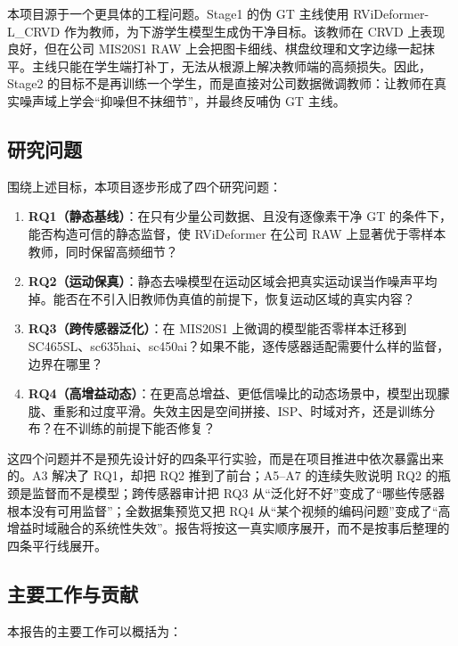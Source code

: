 \documentclass[11pt,a4paper,UTF8,fontset=fandol]{ctexart}
\begin{document}
本项目源于一个更具体的工程问题。Stage1 的伪 GT 主线使用 RViDeformer-L\_CRVD 作为教师，为下游学生模型生成伪干净目标。该教师在 CRVD 上表现良好，但在公司 MIS20S1 RAW 上会把图卡细线、棋盘纹理和文字边缘一起抹平。主线只能在学生端打补丁，无法从根源上解决教师端的高频损失。因此，Stage2 的目标不是再训练一个学生，而是直接对公司数据微调教师：让教师在真实噪声域上学会“抑噪但不抹细节”，并最终反哺伪 GT 主线。

\subsection{研究问题}

围绕上述目标，本项目逐步形成了四个研究问题：

\begin{enumerate}
  \item \textbf{RQ1（静态基线）}：在只有少量公司数据、且没有逐像素干净 GT 的条件下，能否构造可信的静态监督，使 RViDeformer 在公司 RAW 上显著优于零样本教师，同时保留高频细节？
  \item \textbf{RQ2（运动保真）}：静态去噪模型在运动区域会把真实运动误当作噪声平均掉。能否在不引入旧教师伪真值的前提下，恢复运动区域的真实内容？
  \item \textbf{RQ3（跨传感器泛化）}：在 MIS20S1 上微调的模型能否零样本迁移到 SC465SL、sc635hai、sc450ai？如果不能，逐传感器适配需要什么样的监督，边界在哪里？
  \item \textbf{RQ4（高增益动态）}：在更高总增益、更低信噪比的动态场景中，模型出现朦胧、重影和过度平滑。失效主因是空间拼接、ISP、时域对齐，还是训练分布？在不训练的前提下能否修复？
\end{enumerate}

这四个问题并不是预先设计好的四条平行实验，而是在项目推进中依次暴露出来的。A3 解决了 RQ1，却把 RQ2 推到了前台；A5--A7 的连续失败说明 RQ2 的瓶颈是监督而不是模型；跨传感器审计把 RQ3 从“泛化好不好”变成了“哪些传感器根本没有可用监督”；全数据集预览又把 RQ4 从“某个视频的编码问题”变成了“高增益时域融合的系统性失效”。报告将按这一真实顺序展开，而不是按事后整理的四条平行线展开。

\subsection{主要工作与贡献}

本报告的主要工作可以概括为：
\end{document}

